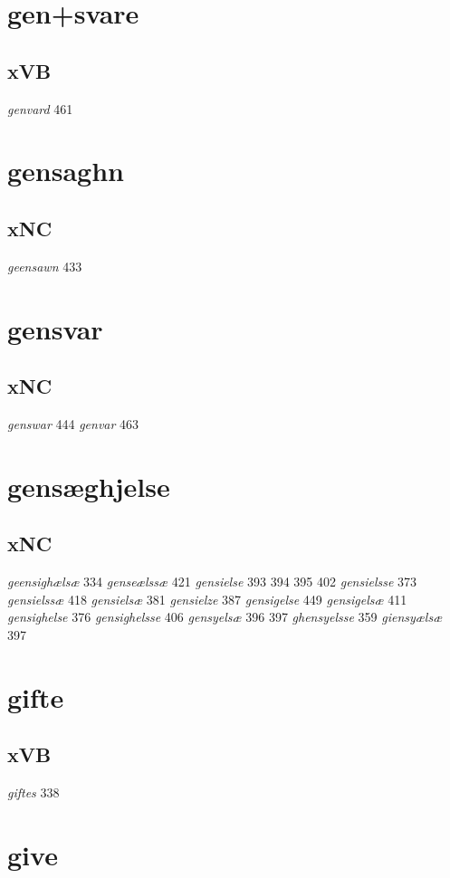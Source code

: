 \documentclass[a4paper,twocolumn]{article}
\begin{document}
\section{gen+svare}
\label{sec:orgd95903e}
\subsection{xVB}
\label{sec:orgf9e5c72}
\emph{genvard} 461 
\section{gensaghn}
\label{sec:org484f7c1}
\subsection{xNC}
\label{sec:org99e717b}
\emph{geensawn} 433 
\section{gensvar}
\label{sec:orgb9f8e68}
\subsection{xNC}
\label{sec:orgf7c6aec}
\emph{genswar} 444 \emph{genvar} 463 
\section{gensæghjelse}
\label{sec:org997a3aa}
\subsection{xNC}
\label{sec:org1623ce9}
\emph{geensighælsæ} 334 \emph{genseælssæ} 421 \emph{gensielse} 393 394 395 402 \emph{gensielsse} 373 \emph{gensielssæ} 418 \emph{gensielsæ} 381 \emph{gensielze} 387 \emph{gensigelse} 449 \emph{gensigelsæ} 411 \emph{gensighelse} 376 \emph{gensighelsse} 406 \emph{gensyelsæ} 396 397 \emph{ghensyelsse} 359 \emph{giensyælsæ} 397 
\section{gifte}
\label{sec:org856511a}
\subsection{xVB}
\label{sec:orgc06a4a4}
\emph{giftes} 338 
\section{give}
\label{sec:org3d3bf51}
\end{document}
